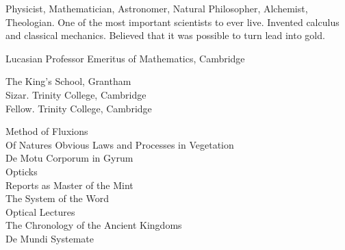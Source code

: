 \documentclass{xetexCV}
\begin{document}
\makecvtitle

Physicist, Mathematician, Astronomer, Natural Philosopher, Alchemist, Theologian.  One of the most important scientists to ever live.  Invented calculus and classical mechanics.  Believed that it was possible to turn lead into gold.

Lucasian Professor Emeritus of Mathematics, Cambridge

The King's School, Grantham  \\
Sizar. Trinity College, Cambridge  \\
Fellow.  Trinity College, Cambridge  

Method of Fluxions  \\
Of Natures Obvious Laws and Processes in Vegetation  \\
De Motu Corporum in Gyrum  \\
Opticks  \\
Reports as Master of the Mint  \\
The System of the Word  \\
Optical Lectures  \\
The Chronology of the Ancient Kingdoms  \\
De Mundi Systemate  \\
\end{document}

